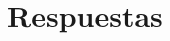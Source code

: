 \documentclass[spanish, fleqn]{article}
\title{
	Introducción a la Informática Teórica \\
	Tarea \#\num \\
	``La Maldición del Tercer Ojo de Visnú''
}
\author{
	{Hernán Vargas Leighton}, 
	{201073009-3}
}
\date{2 de abril 2014}
\begin{document}
	\maketitle
	\thispagestyle{empty}
	\section*{Respuestas}
	\begin{enumerate}


\end{enumerate}
\end{document}
